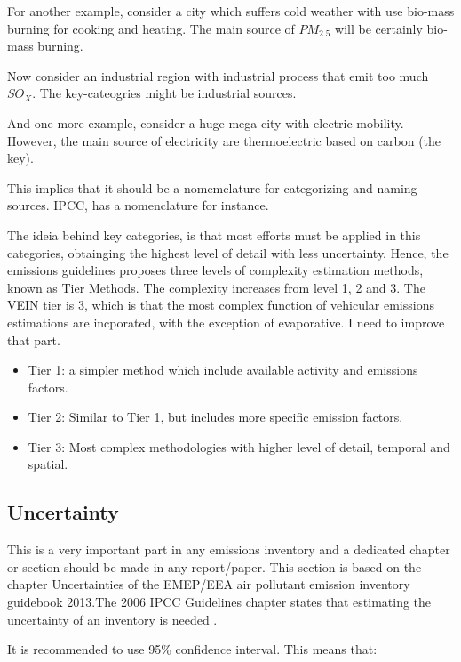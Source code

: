 \documentclass[12pt,graybox,envcountchap,sectrefs]{krantz}
\providecommand{\tightlist}{%
  \setlength{\itemsep}{0pt}\setlength{\parskip}{0pt}}
\theoremstyle{definition}
\theoremstyle{definition}
\theoremstyle{definition}
\theoremstyle{remark}
\begin{document}
For another example, consider a city which suffers cold weather with use
bio-mass burning for cooking and heating. The main source of
\(PM_{2.5}\) will be certainly bio-mass burning.

Now consider an industrial region with industrial process that emit too
much \(SO_X\). The key-cateogries might be industrial sources.

And one more example, consider a huge mega-city with electric mobility.
However, the main source of electricity are thermoelectric based on
carbon (the key).

This implies that it should be a nomemclature for categorizing and
naming sources. IPCC, has a nomenclature for instance.

The ideia behind key categories, is that most efforts must be applied in
this categories, obtainging the highest level of detail with less
uncertainty. Hence, the emissions guidelines \citep{guia} proposes three
levels of complexity estimation methods, known as Tier Methods. The
complexity increases from level 1, 2 and 3. The VEIN tier is 3, which is
that the most complex function of vehicular emissions estimations are
incporated, with the exception of evaporative. I need to improve that
part.

\begin{itemize}
\tightlist
\item
  Tier 1: a simpler method which include available activity and
  emissions factors.
\item
  Tier 2: Similar to Tier 1, but includes more specific emission
  factors.
\item
  Tier 3: Most complex methodologies with higher level of detail,
  temporal and spatial.
\end{itemize}

\subsection{Uncertainty}\label{uncertainty}

This is a very important part in any emissions inventory and a dedicated
chapter or section should be made in any report/paper. This section is
based on the chapter Uncertainties \citep{guiau} of the EMEP/EEA air
pollutant emission inventory guidebook 2013.The 2006 IPCC Guidelines
chapter states that estimating the uncertainty of an inventory is needed
\citep{change20062006}.

It is recommended to use 95\% confidence interval. This means that:
\end{document}
